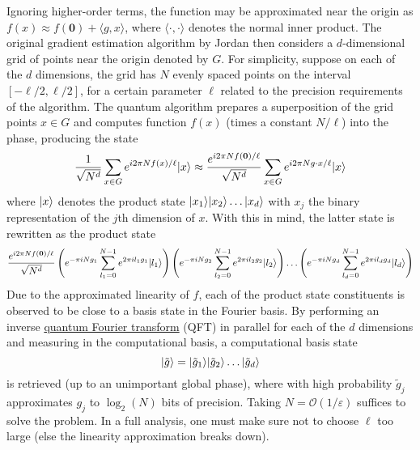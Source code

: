 \begin{refsection}
Ignoring higher-order terms, the function may be approximated near the origin as $f(x) \approx f(\mathbf{0})+\langle g, x \rangle$, where $\langle \cdot, \cdot \rangle$ denotes the normal inner product. The original gradient estimation algorithm by Jordan \cite{jordan2005QuantGrad} then considers a $d$-dimensional grid of points near the origin denoted by $G$. For simplicity, suppose on each of the $d$ dimensions, the grid has $N$ evenly spaced points on the interval $[-\ell/2,\ell/2]$, for a certain parameter $\ell$ related to the precision requirements of the algorithm.   The quantum algorithm prepares a superposition of the grid points $x \in G$ and computes function $f(x)$ (times a constant $N/\ell$) into the phase, producing the state
\begin{equation}
   \frac{1}{\sqrt{N^d}} \sum_{x \in G} e^{i2\pi N f(x)/\ell}\lvert x\rangle \approx \frac{e^{i2\pi N f(\mathbf{0})/\ell}}{\sqrt{N^d}}\sum_{x \in G} e^{i2\pi N g \cdot x/\ell}\lvert x\rangle
\end{equation}
where $\lvert x\rangle$ denotes the product state $\lvert x_1\rangle\lvert x_2\rangle\ldots\lvert x_d\rangle$ with $x_j$ the binary representation of the $j$th dimension of $x$. With this in mind, the latter state is rewritten as the product state
\begin{equation}
    \frac{e^{i2\pi N f(\mathbf{0})/\ell}}{\sqrt{N^d}}\left(e^{-\pi i N g_1}\sum_{l_1 = 0}^{N-1} e^{2\pi i l_1 g_1}\lvert l_1\rangle\right)\left(e^{-\pi i N g_2}\sum_{l_2 = 0}^{N-1} e^{2\pi i l_2 g_2}\lvert l_2\rangle\right)\ldots \left(e^{-\pi i N g_d}\sum_{l_d = 0}^{N-1} e^{2\pi i l_d g_d}\lvert l_d\rangle\right)
\end{equation}
Due to the approximated linearity of $f$, each of the product state constituents is observed to be close to a basis state in the Fourier basis. 
By performing an inverse \hyperref[prim:QFT]{quantum Fourier transform} (QFT) in parallel for each of the $d$ dimensions and measuring in the computational basis, a computational basis state 
\begin{equation}
\lvert\tilde{g}\rangle = \lvert\tilde{g}_1\rangle\lvert\tilde{g}_2\rangle\ldots \lvert\tilde{g}_d\rangle
\end{equation}
is retrieved (up to an unimportant global phase), where with high probability $\tilde{g}_j$ approximates $g_j$ to $\log_2(N)$ bits of precision. Taking $N = \mathcal{O}(1/\varepsilon)$ suffices to solve the problem. In a full analysis, one must make sure not to choose $\ell$ too large (else the linearity approximation breaks down).


\end{refsection}
